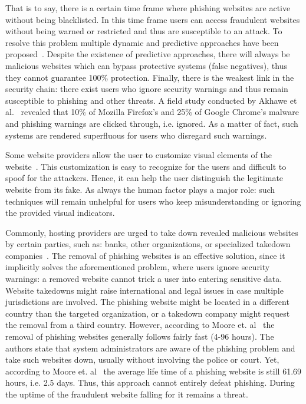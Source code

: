 \begin{description}[leftmargin=0cm]
 That is to say, there is a certain time frame where phishing websites are active without being blacklisted.
 In this time frame users can access fraudulent websites without being warned or restricted and thus are susceptible to an attack.
 To resolve this problem multiple dynamic and predictive approaches have been proposed~\cite{prakash2010phishnet, obied2009fraudulent, balzarotti2012proactive}.
Despite the existence of predictive approaches, there will always be malicious websites which can bypass protective systems (false negatives), thus they cannot guarantee 100\% protection. 
  Finally, there is the weakest link in the security chain: there exist users who ignore security warnings and thus remain susceptible to phishing and other threats.
A field study conducted by Akhawe et al.~\cite{akhawe2013alice} revealed that 10\% of Mozilla Firefox's and 25\% of Google Chrome's malware and phishing warnings are clicked through, i.e. ignored.
 As a matter of fact, such systems are rendered superfluous for users who disregard such warnings.
	\item[Visual Distinction of Websites:] Some website providers allow the user to customize visual elements of the website~\cite{dhamija2005battle}.
This customization is easy to recognize for the users and difficult to spoof for the attackers.
Hence, it can help the user distinguish the legitimate website from its fake.
As always the human factor plays a major role: such techniques will remain unhelpful for users who keep misunderstanding or ignoring the provided visual indicators. 

	\item[Website Takedowns:] Commonly, hosting providers are urged to take down revealed malicious websites by certain parties, such as: banks, other organizations, or specialized takedown companies~\cite{moore2007examining}. The removal of phishing websites is an effective solution, since it implicitly solves the aforementioned problem, where users ignore security warnings: a removed website cannot trick a user into entering sensitive data.
Website takedowns might raise international and legal issues in case multiple jurisdictions are involved.
The phishing website might be located in a different country than the targeted organization, or a takedown company might request the removal from a third country.
However, according to Moore et. al~\cite{mooretakedown} the removal of phishing websites generally follows fairly fast (4-96 hours).
The authors state that system administrators are aware of the phishing problem and take such websites down, usually without involving the police or court.
Yet, according to Moore et. al~\cite{moore2007examining} the average life time of a phishing website is still 61.69 hours, i.e. 2.5 days.
Thus, this approach cannot entirely defeat phishing. During the uptime of the fraudulent website falling for it remains a threat.
\end{description}


